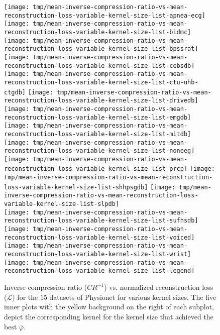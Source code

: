 \documentclass[journal]{IEEEtran}
\begin{document}
\begin{figure*}[!t]
	\texttt{[image: tmp/mean-inverse-compression-ratio-vs-mean-reconstruction-loss-variable-kernel-size-list-apnea-ecg]}
	\texttt{[image: tmp/mean-inverse-compression-ratio-vs-mean-reconstruction-loss-variable-kernel-size-list-bidmc]}
	\texttt{[image: tmp/mean-inverse-compression-ratio-vs-mean-reconstruction-loss-variable-kernel-size-list-bpssrat]}
	\texttt{[image: tmp/mean-inverse-compression-ratio-vs-mean-reconstruction-loss-variable-kernel-size-list-cebsdb]}
	\\
	\texttt{[image: tmp/mean-inverse-compression-ratio-vs-mean-reconstruction-loss-variable-kernel-size-list-ctu-uhb-ctgdb]}
	\texttt{[image: tmp/mean-inverse-compression-ratio-vs-mean-reconstruction-loss-variable-kernel-size-list-drivedb]}
	\texttt{[image: tmp/mean-inverse-compression-ratio-vs-mean-reconstruction-loss-variable-kernel-size-list-emgdb]}
	\texttt{[image: tmp/mean-inverse-compression-ratio-vs-mean-reconstruction-loss-variable-kernel-size-list-mitdb]}
	\\
	\texttt{[image: tmp/mean-inverse-compression-ratio-vs-mean-reconstruction-loss-variable-kernel-size-list-noneeg]}
	\texttt{[image: tmp/mean-inverse-compression-ratio-vs-mean-reconstruction-loss-variable-kernel-size-list-prcp]}
	\texttt{[image: tmp/mean-inverse-compression-ratio-vs-mean-reconstruction-loss-variable-kernel-size-list-shhpsgdb]}
	\texttt{[image: tmp/mean-inverse-compression-ratio-vs-mean-reconstruction-loss-variable-kernel-size-list-slpdb]}
	\\
	\texttt{[image: tmp/mean-inverse-compression-ratio-vs-mean-reconstruction-loss-variable-kernel-size-list-sufhsdb]}
	\texttt{[image: tmp/mean-inverse-compression-ratio-vs-mean-reconstruction-loss-variable-kernel-size-list-voiced]}
	\texttt{[image: tmp/mean-inverse-compression-ratio-vs-mean-reconstruction-loss-variable-kernel-size-list-wrist]}
	\texttt{[image: tmp/mean-inverse-compression-ratio-vs-mean-reconstruction-loss-variable-kernel-size-list-legend]}
	\caption{Inverse compression ratio ($CR^{-1}$) vs. normalized reconstruction loss ($\tilde{\mathcal{L}}$) for the $15$ datasets of Physionet for various kernel sizes.
	The five inner plots with the yellow background on the right of each subplot, depict the corresponding kernel for the kernel size that achieved the best $\bar\varphi$.}
	\label{fig:crrl}
\end{figure*}
\end{document}
